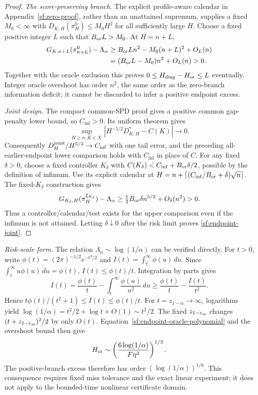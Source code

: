 \documentclass[journal]{IEEEtran}
\begin{document}
\begin{proof}
\par\smallskip\noindent\emph{The score-preserving branch.}
The explicit profile-aware calendar in Appendix~\ref{sf:zero-proof},
rather than an unattained supremum, supplies a fixed $M_0<\infty$ with
$D_{K,H}(\pi_H^0)\le M_0H^2$ for all sufficiently large $H$.
Choose a fixed positive integer $L$ such that $B_{\rm or}L>M_0$.
At $H=n+L$,
\begin{equation}\label{sf:endpoint-zero-upper}
\begin{aligned}
G_{K,n+L}(\pi_{n+L}^0)-\Lambda_\alpha
 &\ge B_{\rm or}Ln^2-M_0(n+L)^2+O_L(n)\\
 &=(B_{\rm or}L-M_0)n^2+O_L(n)>0.
\end{aligned}
\end{equation}
Together with the oracle exclusion this proves
$0\le H_{\rm diag}-H_{\rm or}\le L$ eventually. Integer oracle overshoot
has order $n^2$, the same order as the zero-branch information deficit;
it cannot be discarded to infer a positive endpoint excess.

\par\smallskip\noindent\emph{Joint design.}
The compact common-SPD proof gives a positive common gap-penalty lower bound,
so $C_{\inf}>0$. Its uniform theorem gives
\[
\sup_{H\ge n,K\in\mathcal K}
\left|H^{-5/2}D_{K,H}^*-C(K)\right|\longrightarrow0.
\]
Consequently $D_H^{\rm joint}/H^{5/2}\to C_{\inf}$ with one tail error,
and the preceding all-earlier-endpoint lower comparison holds with
$C_{\inf}$ in place of $C$.
For any fixed $\delta>0$, choose a fixed controller $K_\delta$ with
$C(K_\delta)<C_{\inf}+B_{\rm or}\delta/2$, possible by the definition of
infimum. Use its explicit calendar at
$H=n+\lceil(C_{\inf}/B_{\rm or}+\delta)\sqrt n\rceil$.
The fixed-$K_\delta$ construction gives
\[
G_{K_\delta,H}(\pi_H^{\xi_{K_\delta}})-\Lambda_\alpha
 \ge \tfrac12B_{\rm or}\delta n^{5/2}+O_\delta(n^2)>0.
\]
Thus a controller/calendar/test exists for the upper comparison even if
the infimum is not attained. Letting $\delta\downarrow0$ after the risk limit
proves \eqref{sf:endpoint-joint}.
\end{proof}

\par\smallskip\noindent\emph{Risk-scale form.}
The relation $\Lambda_\alpha\sim\log(1/\alpha)$ can be verified directly.
For $t>0$, write $\phi(t)=(2\pi)^{-1/2}e^{-t^2/2}$ and
$I(t)=\int_t^\infty\phi(u)\,du$. Since
$\int_t^\infty u\phi(u)\,du=\phi(t)$, $I(t)\le\phi(t)/t$.
Integration by parts gives
\[
I(t)=\frac{\phi(t)}t-\int_t^\infty\frac{\phi(u)}{u^2}\,du
 \ge\frac{\phi(t)}t-\frac{I(t)}{t^2}.
\]
Hence $t\phi(t)/(t^2+1)\le I(t)\le\phi(t)/t$.
For $t=z_{1-\alpha}\to\infty$, logarithms yield
$\log(1/\alpha)=t^2/2+\log t+O(1)\sim t^2/2$.
The fixed $z_{1-\varepsilon_{\rm m}}$ changes
$(t+z_{1-\varepsilon_{\rm m}})^2/2$ by only $O(t)$.
Equation~\eqref{sf:endpoint-oracle-polynomial} and the overshoot bound then give
\[
H_{\rm or}\sim
\left(\frac{6\log(1/\alpha)}{F\eta^2}\right)^{1/3}.
\]
The positive-branch excess therefore has order $(\log(1/\alpha))^{1/6}$.
This consequence requires fixed miss tolerance and the exact linear experiment;
it does not apply to the bounded-time nonlinear certificate domain.
\end{document}
